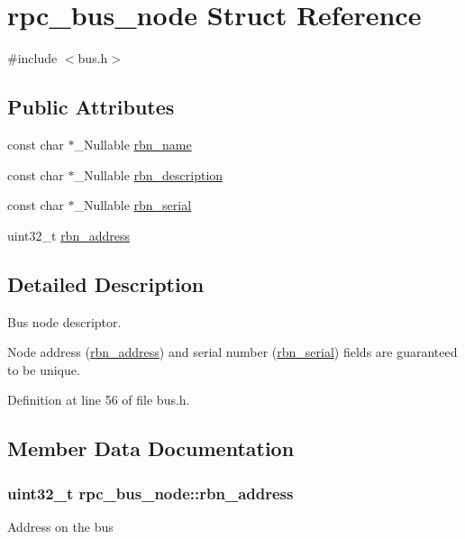 \hypertarget{structrpc__bus__node}{}\section{rpc\+\_\+bus\+\_\+node Struct Reference}
\label{structrpc__bus__node}


{\ttfamily \#include $<$bus.\+h$>$}

\subsection*{Public Attributes}
\begin{DoxyCompactItemize}
\item 
const char $\ast$\+\_\+\+Nullable \hyperlink{structrpc__bus__node_a9afbf9a155ae01c1c47dc210a8334022}{rbn\+\_\+name}
\item 
const char $\ast$\+\_\+\+Nullable \hyperlink{structrpc__bus__node_af5d23beee7c50520e7235f0c922fafb1}{rbn\+\_\+description}
\item 
const char $\ast$\+\_\+\+Nullable \hyperlink{structrpc__bus__node_a885b358a61a0b459d86d7c534be6ef0f}{rbn\+\_\+serial}
\item 
uint32\+\_\+t \hyperlink{structrpc__bus__node_a624e2a0be665938924ab2f815afb669e}{rbn\+\_\+address}
\end{DoxyCompactItemize}


\subsection{Detailed Description}
Bus node descriptor.

Node address (\hyperlink{structrpc__bus__node_a624e2a0be665938924ab2f815afb669e}{rbn\+\_\+address}) and serial number (\hyperlink{structrpc__bus__node_a885b358a61a0b459d86d7c534be6ef0f}{rbn\+\_\+serial}) fields are guaranteed to be unique. 

Definition at line 56 of file bus.\+h.



\subsection{Member Data Documentation}
\subsubsection[{\texorpdfstring{rbn\+\_\+address}{rbn_address}}]{\setlength{\rightskip}{0pt plus 5cm}uint32\+\_\+t rpc\+\_\+bus\+\_\+node\+::rbn\+\_\+address}\hypertarget{structrpc__bus__node_a624e2a0be665938924ab2f815afb669e}{}\label{structrpc__bus__node_a624e2a0be665938924ab2f815afb669e}
Address on the bus 

